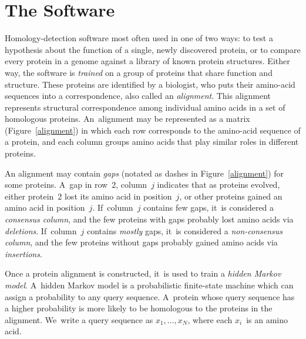 \documentclass[preprint,nonatbib,blockstyle,nocopyrightspace,times]{sigplanconf}
\newcommand\figref[1]{Figure~\ref{#1}}
\newcommand\seclabel[1]{\label{sec:#1}}
\begin{document}
\section{The Software}


\seclabel{viterbi}

Homology-detection software most often used in one of two ways:
to test a hypothesis about 
the function of a single, newly discovered protein, or 
to compare every protein in a genome against a library of known protein 
structures.
Either way, 
the software is \emph{trained}
on a group of proteins that share function and structure.
These proteins are identified by a biologist, who puts
their amino-acid sequences into a correspondence, also called an
\emph{alignment}. 
This alignment represents structural
correspondence among individual amino acids in a set of homologous proteins.
An~alignment may be represented as a matrix
(Figure~\ref{alignment}) 
in which each row corresponds to the amino-acid sequence of a protein,
and each column groups amino acids that play similar roles in
different proteins.


An alignment may contain \emph{gaps} (notated as dashes in
\figref{alignment}) for some proteins.
A~gap in row~2, column~$j$ indicates that as proteins evolved, either 
protein~2 lost its amino acid in position~$j$, or 
other proteins gained an amino acid in position~$j$.
If~column~$j$ contains few gaps, 
it~is considered a \emph{consensus column},
and the few proteins with gaps probably lost amino acids via
\emph{deletions}. 
If~column~$j$ contains \emph{mostly} gaps, 
it~is considered a \emph{non-consensus column},
and the few proteins without gaps probably gained amino acids via
\emph{insertions}. 

Once a protein alignment is constructed, it~is used to train a
\emph{hidden Markov model}. 
A~hidden Markov model is a probabilistic finite-state machine which 
can assign a probability to any query sequence.
A~protein whose query sequence has a higher probability is more likely to %
be homologous to the proteins in the alignment.
We~write a query sequence as $x_1, \ldots, x_{\scriptscriptstyle N}$,
where each $x_i$~is 
an amino acid.
\end{document}
